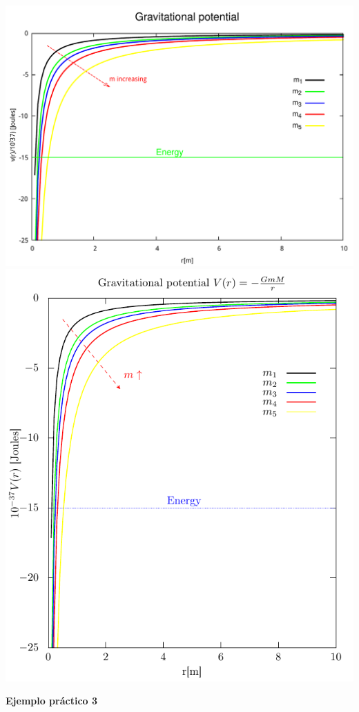 \documentclass[11.5pt,a4paper]{article}
\begin{document}
\includegraphics[scale=0.40]{ejemplo5.pdf}  
\includegraphics[scale=0.75]{ejemplo6.pdf} 

\textbf{Ejemplo práctico 3}
\end{document}
